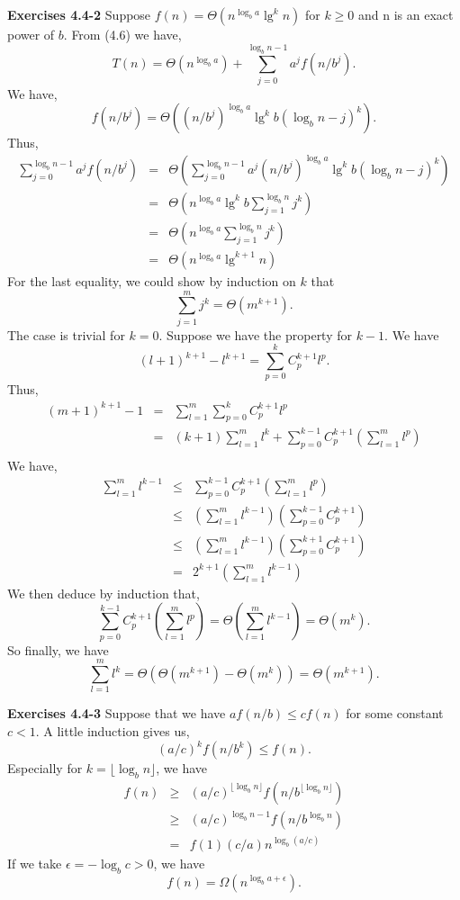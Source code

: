 \documentclass[a4paper,12pt]{article}
\newcommand{\newpar}[1]
{\bigskip \noindent \textbf{Exercises #1} \newline}
\begin{document}
\newpar{4.4-2} Suppose $f(n) = \Theta(n^{\log_ba}\lg^k n)$ for $k \ge 0$
and n is an exact power of $b$.  From (4.6) we have,
\[ T(n) = \Theta(n^{\log_b a}) +
\sum_{j=0}^{\log_b n -1}a^jf(n/b^j).\]
We have,
\[ f(n/b^j) = \Theta((n/b^j)^{\log_b a}\lg^k b(\log_b n - j)^k).\]
Thus,
\begin{eqnarray*}
  \sum_{j=0}^{\log_b n - 1} a^jf(n/b^j) &=&
  \Theta\left(\sum_{j=0}^{\log_b n - 1}a^j(n/b^j)^{\log_b a}\lg^k b(\log_b n
  - j)^k\right) \\ &=&
  \Theta\left(n^{\log_b a}\lg^kb\sum_{j=1}^{\log_b n}j^k\right) \\ &=&
  \Theta\left(n^{\log_b a}\sum_{j=1}^{\log_b n}j^k\right) \\ &=&
  \Theta(n^{\log_b a}\lg^{k+1}n)
\end{eqnarray*}
For the last equality, we could show by induction on $k$ that
\[ \sum_{j=1}^m j^k = \Theta(m^{k+1}).\]
The case is trivial for $k=0$.  Suppose we have the property for
$k-1$.  We have
\[ (l+1)^{k+1} - l^{k+1} = \sum_{p=0}^k C_p^{k+1} l^p.\]
Thus,
\begin{eqnarray*}
  (m+1)^{k+1} - 1 &=& \sum_{l=1}^m\sum_{p=0}^kC_p^{k+1}l^p \\
  &=& (k+1) \sum_{l=1}^m l^k +
  \sum_{p=0}^{k-1}C_p^{k+1}\left(\sum_{l=1}^m l^p\right) \\
\end{eqnarray*}
We have,
\begin{eqnarray*}
  \sum_{l=1}^ml^{k-1} &\le& \sum_{p=0}^{k-1}C_p^{k+1}
  \left(\sum_{l=1}^ml^p\right) \\ &\le&
  \left(\sum_{l=1}^ml^{k-1}\right)
  \left(\sum_{p=0}^{k-1}C_p^{k+1}\right) \\ &\le&
  \left(\sum_{l=1}^ml^{k-1}\right)
  \left(\sum_{p=0}^{k+1}C_p^{k+1}\right) \\ &=&
  2^{k+1}\left(\sum_{l=1}^ml^{k-1}\right)
\end{eqnarray*}
We then deduce by induction that,
\[ \sum_{p=0}^{k-1} C_p^{k+1}\left(\sum_{l=1}^ml^p\right) =
\Theta\left(\sum_{l=1}^ml^{k-1}\right) =
\Theta(m^k).\]
So finally, we have
\[ \sum_{l=1}^ml^k = \Theta(\Theta(m^{k+1}) - \Theta(m^k))
= \Theta(m^{k+1}).\]

\newpar{4.4-3}
Suppose that we have $af(n/b) \le cf(n)$ for some constant $c < 1$.  A
little induction gives us,
\[ (a/c)^kf(n/b^k) \le f(n).\]
Especially for $k = \lfloor\log_b n\rfloor$, we have
\begin{eqnarray*}
  f(n) &\ge& (a/c)^{\lfloor\log_b n\rfloor}
  f(n/b^{\lfloor\log_b n\rfloor}) \\
  &\ge& (a/c)^{\log_b n - 1}f(n/b^{\log_b n}) \\
  &=& f(1) (c/a) n^{\log_b (a/c)}
\end{eqnarray*}
If we take $\epsilon = -\log_b c > 0$, we have
\[ f(n) = \Omega(n^{\log_ba+\epsilon}).\]
\end{document}
